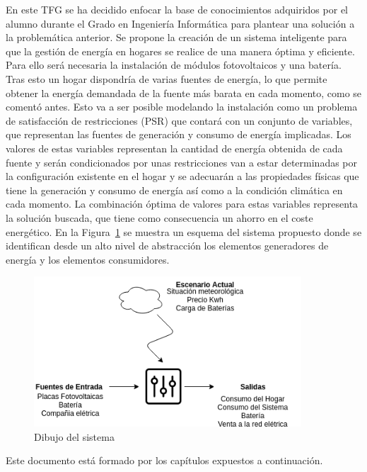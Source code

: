 En este \gls{TFG} se ha decidido enfocar la base de conocimientos adquiridos por el alumno durante el Grado en Ingeniería Informática para plantear una solución a la problemática anterior. Se propone la creación de un sistema inteligente para que la gestión de energía en hogares se realice de una manera óptima y eficiente. Para ello será necesaria la instalación de módulos fotovoltaicos y una batería. Tras esto un hogar dispondría de varias fuentes de energía, lo que permite obtener la energía demandada de la fuente más barata en cada momento, como se comentó antes. Esto va a ser posible modelando la instalación como un problema de satisfacción de restricciones (\gls{PSR}) que contará con un conjunto de variables, que representan las fuentes de generación y consumo de energía implicadas. Los valores de estas variables representan la cantidad de energía obtenida de cada fuente y serán condicionados por unas restricciones van a estar determinadas por la configuración existente en el hogar y se adecuarán a las propiedades físicas que tiene la generación y consumo de energía así como a la condición climática en cada momento. La combinación óptima de valores para estas variables representa la solución buscada, que tiene como consecuencia un ahorro en el coste energético. En la Figura~\ref{fig:abstract} se muestra un esquema del sistema propuesto donde se identifican desde un alto nivel de abstracción los elementos generadores de energía y los elementos consumidores.\\
\begin{figure}[!h]
	\centering
	\includegraphics[width=10cm]{figs/Abstract.png}
	\caption{Dibujo del sistema}
        \label{fig:abstract}
\end{figure}


Este documento está formado por los capítulos expuestos a continuación.

